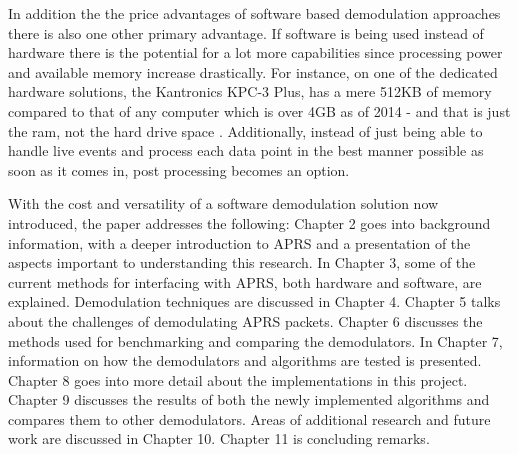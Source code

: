 In addition the the price advantages of software based demodulation approaches there is also one other primary advantage. If software is being used instead of hardware there is the potential for a lot more capabilities since processing power and available memory increase drastically. For instance, on one of the dedicated hardware solutions, the Kantronics KPC-3 Plus, has a mere 512KB of memory compared to that of any computer which is over 4GB as of 2014 - and that is just the ram, not the hard drive space \cite{Kantronics2014,Graham-Smith2014}. Additionally, instead of just being able to handle live events and process each data point in the best manner possible as soon as it comes in, post processing becomes an option.

With the cost and versatility of a software demodulation solution now introduced, the paper addresses the following: Chapter 2 goes into background information, with a deeper introduction to APRS and a presentation of the aspects important to understanding this research. In Chapter 3, some of the current methods for interfacing with APRS, both hardware and software, are explained. Demodulation techniques are discussed in Chapter 4. Chapter 5 talks about the challenges of demodulating APRS packets. Chapter 6 discusses the methods used for benchmarking and comparing the demodulators. In Chapter 7, information on how the demodulators and algorithms are tested is presented. Chapter 8 goes into more detail about the implementations in this project. Chapter 9 discusses the results of both the newly implemented algorithms and compares them to other demodulators. Areas of additional research and future work are discussed in Chapter 10. Chapter 11 is concluding remarks.
